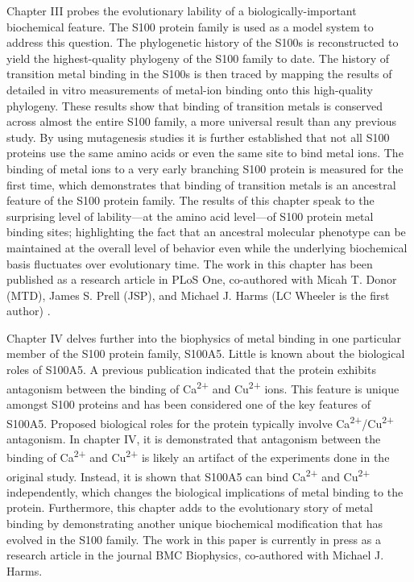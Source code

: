 Chapter III probes the evolutionary lability of a biologically-important
biochemical feature. The S100 protein family is used as a model system
to address this question. The phylogenetic history of the S100s is
reconstructed to yield the highest-quality phylogeny of the S100 family
to date. The history of transition metal binding in the S100s is then
traced by mapping the results of detailed in vitro measurements of
metal-ion binding onto this high-quality phylogeny. These results
show that binding of transition metals is conserved across almost
the entire S100 family, a more universal result than any previous
study. By using mutagenesis studies it is further established that
not all S100 proteins use the same amino acids or even the same site
to bind metal ions. The binding of metal ions to a very early branching
S100 protein is measured for the first time, which demonstrates that
binding of transition metals is an ancestral feature of the S100 protein
family. The results of this chapter speak to the surprising level
of lability---at the amino acid level---of S100 protein metal binding
sites; highlighting the fact that an ancestral molecular phenotype
can be maintained at the overall level of behavior even while the
underlying biochemical basis fluctuates over evolutionary time. The
work in this chapter has been published as a research article in PLoS
One, co-authored with Micah T. Donor (MTD), James S. Prell (JSP), and
Michael J. Harms (LC Wheeler is the first author) \citep{wheeler_multiple_2016}. 

Chapter IV delves further into the biophysics of metal binding in
one particular member of the S100 protein family, S100A5. Little is
known about the biological roles of S100A5. A previous publication
indicated that the protein exhibits antagonism between the binding
of Ca\textsuperscript{2+} and Cu\textsuperscript{2+} ions. This
feature is unique amongst S100 proteins and has been considered one
of the key features of S100A5. Proposed biological roles for the protein
typically involve Ca\textsuperscript{2+}/Cu\textsuperscript{2+}
antagonism. In chapter IV, it is demonstrated that antagonism between
the binding of Ca\textsuperscript{2+} and Cu\textsuperscript{2+}
is likely an artifact of the experiments done in the original study.
Instead, it is shown that S100A5 can bind Ca\textsuperscript{2+}
and Cu\textsuperscript{2+} independently, which changes the biological
implications of metal binding to the protein. Furthermore, this chapter
adds to the evolutionary story of metal binding by demonstrating another
unique biochemical modification that has evolved in the S100 family.
The work in this paper is currently in press as a research
article in the journal BMC Biophysics, co-authored with Michael J.
Harms. 

